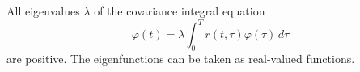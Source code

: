 All eigenvalues $\lambda$ of the covariance integral equation
$$\varphi(t) = \lambda \int_0^T r(t,\tau) \varphi(\tau) \, d\tau$$
are positive. The eigenfunctions can be taken as real-valued functions.
